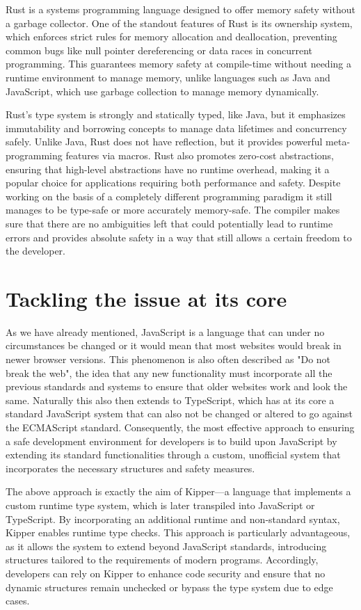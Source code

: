 Rust is a systems programming language designed to offer memory safety without a garbage collector. One of the standout features of Rust is its ownership system, which enforces strict rules for memory allocation and deallocation, preventing common bugs like null pointer dereferencing or data races in concurrent programming. This guarantees memory safety at compile-time without needing a runtime environment to manage memory, unlike languages such as Java and JavaScript, which use garbage collection to manage memory dynamically.

Rust's type system is strongly and statically typed, like Java, but it emphasizes immutability and borrowing concepts to manage data lifetimes and concurrency safely. Unlike Java, Rust does not have reflection, but it provides powerful meta-programming features via macros. Rust also promotes zero-cost abstractions, ensuring that high-level abstractions have no runtime overhead, making it a popular choice for applications requiring both performance and safety. Despite working on the basis of a completely different programming paradigm it still manages to be type-safe or more accurately memory-safe. The compiler makes sure that there are no ambiguities left that could potentially lead to runtime errors and provides absolute safety in a way that still allows a certain freedom to the developer.

\section{Tackling the issue at its core}

As we have already mentioned, JavaScript is a language that can under no circumstances be changed or it would mean that most websites would break in newer browser versions. This phenomenon is also often described as "Do not break the web", the idea that any new functionality must incorporate all the previous standards and systems to ensure that older websites work and look the same. Naturally this also then extends to TypeScript, which has at its core a standard JavaScript system that can also not be changed or altered to go against the ECMAScript standard. Consequently, the most effective approach to ensuring a safe development environment for developers is to build upon JavaScript by extending its standard functionalities through a custom, unofficial system that incorporates the necessary structures and safety measures.

The above approach is exactly the aim of Kipper—a language that implements a custom runtime type system, which is later transpiled into JavaScript or TypeScript. By incorporating an additional runtime and non-standard syntax, Kipper enables runtime type checks. This approach is particularly advantageous, as it allows the system to extend beyond JavaScript standards, introducing structures tailored to the requirements of modern programs. Accordingly, developers can rely on Kipper to enhance code security and ensure that no dynamic structures remain unchecked or bypass the type system due to edge cases.

